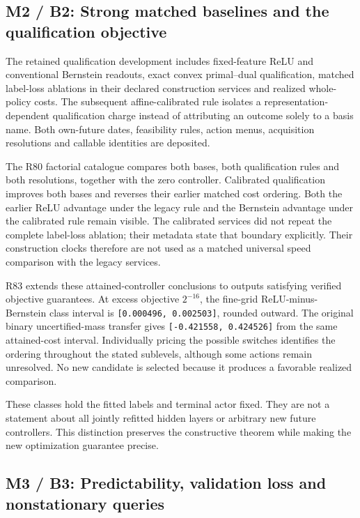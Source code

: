 \hypertarget{m2-b2-strong-matched-baselines-and-the-qualification-objective}{%
\subsection{M2 / B2: Strong matched baselines and the qualification
objective}\label{m2-b2-strong-matched-baselines-and-the-qualification-objective}}

The retained qualification development includes fixed-feature ReLU and
conventional Bernstein readouts, exact convex primal--dual
qualification, matched label-loss ablations in their declared
construction services and realized whole-policy costs. The subsequent
affine-calibrated rule isolates a representation-dependent qualification
charge instead of attributing an outcome solely to a basis name. Both
own-future dates, feasibility rules, action menus, acquisition
resolutions and callable identities are deposited.

The R80 factorial catalogue compares both bases, both qualification
rules and both resolutions, together with the zero controller.
Calibrated qualification improves both bases and reverses their earlier
matched cost ordering. Both the earlier ReLU advantage under the legacy
rule and the Bernstein advantage under the calibrated rule remain
visible. The calibrated services did not repeat the complete label-loss
ablation; their metadata state that boundary explicitly. Their
construction clocks therefore are not used as a matched universal speed
comparison with the legacy services.

R83 extends these attained-controller conclusions to outputs satisfying
verified objective guarantees. At excess objective \(2^{-16}\), the
fine-grid ReLU-minus-Bernstein class interval is
\texttt{{[}0.000496,\ 0.002503{]}}, rounded outward. The original binary
uncertified-mass transfer gives \texttt{{[}-0.421558,\ 0.424526{]}} from
the same attained-cost interval. Individually pricing the possible
switches identifies the ordering throughout the stated sublevels,
although some actions remain unresolved. No new candidate is selected
because it produces a favorable realized comparison.

These classes hold the fitted labels and terminal actor fixed. They are
not a statement about all jointly refitted hidden layers or arbitrary
new future controllers. This distinction preserves the constructive
theorem while making the new optimization guarantee precise.

\hypertarget{m3-b3-predictability-validation-loss-and-nonstationary-queries}{%
\subsection{M3 / B3: Predictability, validation loss and nonstationary
queries}\label{m3-b3-predictability-validation-loss-and-nonstationary-queries}}

